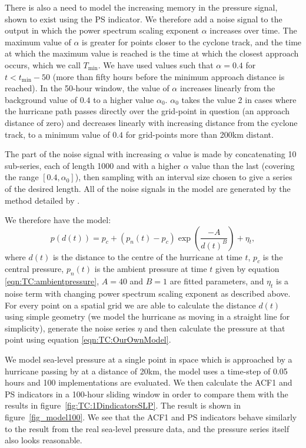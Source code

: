 There is also a need to model the increasing memory in the pressure signal, shown to exist using the PS indicator. We therefore add a noise signal to the output in which the power spectrum scaling exponent $\alpha$ increases over time. The maximum value of $\alpha$ is greater for points closer to the cyclone track, and the time at which the maximum value is reached is the time at which the closest approach occurs, which we call $T_{\min}$. We have used values such that $\alpha=0.4$ for $t<t_{\min}-50$ (more than fifty hours before the minimum approach distance is reached). In the 50-hour window, the value of $\alpha$ increases linearly from the background value of $0.4$ to a higher value $\alpha_0$. $\alpha_0$ takes the value 2 in cases where the hurricane path passes directly over the grid-point in question (an approach distance of zero) and decreases linearly with increasing distance from the cyclone track, to a minimum value of $0.4$ for grid-points more than 200km distant.

The part of the noise signal with increasing $\alpha$ value is made by concatenating 10 sub-series, each of length 1000 and with a higher $\alpha$ value than the last (covering the range $[0.4, \alpha_0]$), then sampling with an interval size chosen to give a series of the desired length. All of the noise signals in the model are generated by the method detailed by \citet{kasdin1995}.

We therefore have the model:
	\begin{equation}
		p(d(t)) = p_c + (p_n(t)-p_c)\exp\left( \frac{-A}{d(t)^B} \right) + \eta_t,
	\label{eqn:TC:OurOwnModel}
	\end{equation} 
where $d(t)$ is the distance to the centre of the hurricane at time $t$, $p_c$ is the central pressure, $p_n(t)$ is the ambient pressure at time $t$ given by equation \ref{eqn:TC:ambientpressure}, $A=40$ and $B=1$ are fitted parameters, and $\eta_t$ is a noise term with changing power spectrum scaling exponent as described above. For every point on a spatial grid we are able to calculate the distance $d(t)$ using simple geometry (we model the hurricane as moving in a straight line for simplicity), generate the noise series $\eta$ and then calculate the pressure at that point using equation \ref{eqn:TC:OurOwnModel}. 

We model sea-level pressure at a single point in space which is approached by a hurricane passing by at a distance of 20km, the model uses a time-step of 0.05 hours and 100 implementations are evaluated. We then calculate the ACF1 and PS indicators in a 100-hour sliding window in order to compare them with the results in figure~\ref{fig:TC:1DindicatorsSLP}. The result is shown in figure~\ref{fig_model100}. We see that the ACF1 and PS indicators behave similarly to the result from the real sea-level pressure data, and the pressure series itself also looks reasonable. 

